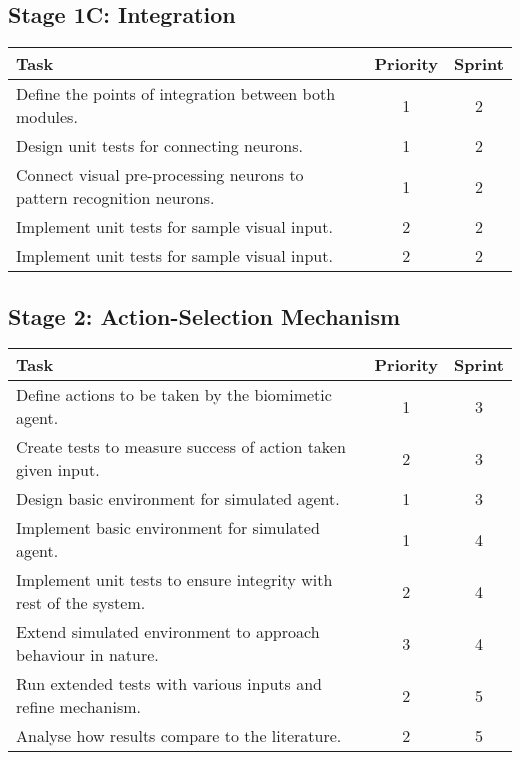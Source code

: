 \documentclass[a4paper,11pt]{article}
\begin{document}
\subsection{Stage 1C: Integration}
\begin{center}
    \begin{tabular}{p{12cm} c c}
    \textbf{Task} & \textbf{Priority} & \textbf{Sprint} \\ \hline
	Define the points of integration between both modules. & 1 & 2 \\
	Design unit tests for connecting neurons. & 1 & 2 \\    
	Connect visual pre-processing neurons to pattern recognition neurons. & 1 & 2 \\    
	Implement unit tests for sample visual input. & 2 & 2 \\
	Implement unit tests for sample visual input. & 2 & 2 \\
    \end{tabular}
\end{center}

\subsection{Stage 2: Action-Selection Mechanism}
\begin{center}
    \begin{tabular}{p{12cm} c c}
    \textbf{Task} & \textbf{Priority} & \textbf{Sprint} \\ \hline
	Define actions to be taken by the biomimetic agent. & 1 & 3 \\
	Create tests to measure success of action taken given input. & 2 & 3 \\ 
	Design basic environment for simulated agent. & 1 & 3 \\
	Implement basic environment for simulated agent. & 1 & 4 \\
	Implement unit tests to ensure integrity with rest of the system. & 2 & 4 \\
	Extend simulated environment to approach behaviour in nature. & 3 & 4 \\
	Run extended tests with various inputs and refine mechanism. & 2 & 5 \\
	Analyse how results compare to the literature. & 2 & 5 \\
    \end{tabular}
\end{center}
\end{document}

